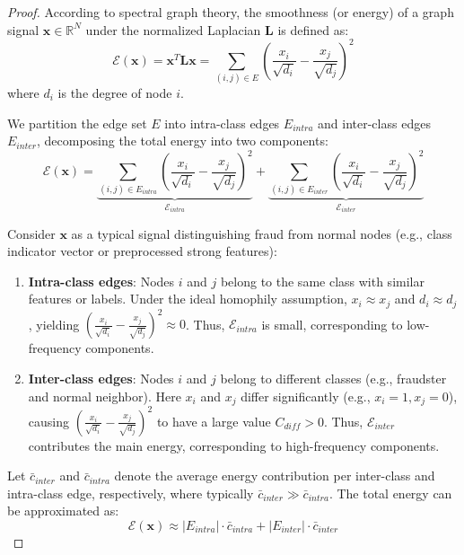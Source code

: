 \begin{proof}
According to spectral graph theory, the smoothness (or energy) of a graph signal $\mathbf{x} \in \mathbb{R}^N$ under the normalized Laplacian $\mathbf{L}$ is defined as:
\begin{equation}
\mathcal{E}(\mathbf{x}) = \mathbf{x}^T \mathbf{L} \mathbf{x} = \sum_{(i,j) \in E} \left( \frac{x_i}{\sqrt{d_i}} - \frac{x_j}{\sqrt{d_j}} \right)^2
\end{equation}
where $d_i$ is the degree of node $i$.

We partition the edge set $E$ into intra-class edges $E_{intra}$ and inter-class edges $E_{inter}$, decomposing the total energy into two components:
\begin{equation}
\mathcal{E}(\mathbf{x}) = \underbrace{\sum_{(i,j) \in E_{intra}} \left( \frac{x_i}{\sqrt{d_i}} - \frac{x_j}{\sqrt{d_j}} \right)^2}_{\mathcal{E}_{intra}} + \underbrace{\sum_{(i,j) \in E_{inter}} \left( \frac{x_i}{\sqrt{d_i}} - \frac{x_j}{\sqrt{d_j}} \right)^2}_{\mathcal{E}_{inter}}
\end{equation}

Consider $\mathbf{x}$ as a typical signal distinguishing fraud from normal nodes (e.g., class indicator vector or preprocessed strong features):
\begin{enumerate}
    \item \textbf{Intra-class edges}: Nodes $i$ and $j$ belong to the same class with similar features or labels. Under the ideal homophily assumption, $x_i \approx x_j$ and $d_i \approx d_j$, yielding $\left( \frac{x_i}{\sqrt{d_i}} - \frac{x_j}{\sqrt{d_j}} \right)^2 \approx 0$. Thus, $\mathcal{E}_{intra}$ is small, corresponding to low-frequency components.

    \item \textbf{Inter-class edges}: Nodes $i$ and $j$ belong to different classes (e.g., fraudster and normal neighbor). Here $x_i$ and $x_j$ differ significantly (e.g., $x_i=1, x_j=0$), causing $\left( \frac{x_i}{\sqrt{d_i}} - \frac{x_j}{\sqrt{d_j}} \right)^2$ to have a large value $C_{diff} > 0$. Thus, $\mathcal{E}_{inter}$ contributes the main energy, corresponding to high-frequency components.
\end{enumerate}

Let $\bar{c}_{inter}$ and $\bar{c}_{intra}$ denote the average energy contribution per inter-class and intra-class edge, respectively, where typically $\bar{c}_{inter} \gg \bar{c}_{intra}$. The total energy can be approximated as:
\begin{equation}
\mathcal{E}(\mathbf{x}) \approx |E_{intra}| \cdot \bar{c}_{intra} + |E_{inter}| \cdot \bar{c}_{inter}
\end{equation}


\end{proof}

